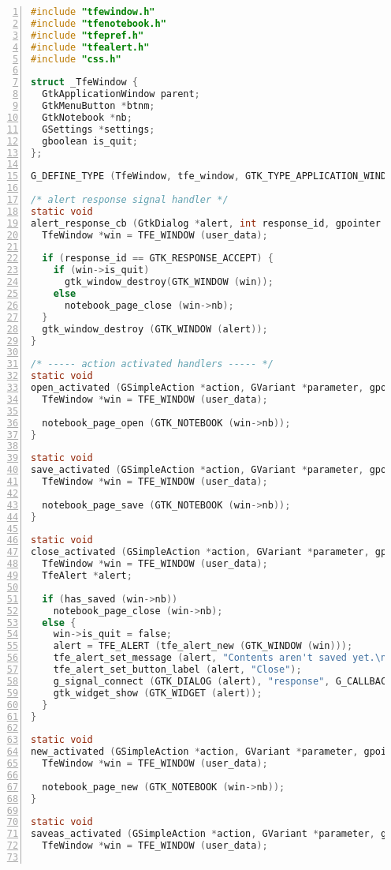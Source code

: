 \begin{lstlisting}[language=C, numbers=left]
#include "tfewindow.h"
#include "tfenotebook.h"
#include "tfepref.h"
#include "tfealert.h"
#include "css.h"

struct _TfeWindow {
  GtkApplicationWindow parent;
  GtkMenuButton *btnm;
  GtkNotebook *nb;
  GSettings *settings;
  gboolean is_quit;
};

G_DEFINE_TYPE (TfeWindow, tfe_window, GTK_TYPE_APPLICATION_WINDOW);

/* alert response signal handler */
static void
alert_response_cb (GtkDialog *alert, int response_id, gpointer user_data) {
  TfeWindow *win = TFE_WINDOW (user_data);

  if (response_id == GTK_RESPONSE_ACCEPT) {
    if (win->is_quit)
      gtk_window_destroy(GTK_WINDOW (win));
    else
      notebook_page_close (win->nb);
  }
  gtk_window_destroy (GTK_WINDOW (alert));
}

/* ----- action activated handlers ----- */
static void
open_activated (GSimpleAction *action, GVariant *parameter, gpointer user_data) {
  TfeWindow *win = TFE_WINDOW (user_data);

  notebook_page_open (GTK_NOTEBOOK (win->nb));
}

static void
save_activated (GSimpleAction *action, GVariant *parameter, gpointer user_data) {
  TfeWindow *win = TFE_WINDOW (user_data);

  notebook_page_save (GTK_NOTEBOOK (win->nb));
}

static void
close_activated (GSimpleAction *action, GVariant *parameter, gpointer user_data) {
  TfeWindow *win = TFE_WINDOW (user_data);
  TfeAlert *alert;

  if (has_saved (win->nb))
    notebook_page_close (win->nb);
  else {
    win->is_quit = false;
    alert = TFE_ALERT (tfe_alert_new (GTK_WINDOW (win)));
    tfe_alert_set_message (alert, "Contents aren't saved yet.\nAre you sure to close?");
    tfe_alert_set_button_label (alert, "Close");
    g_signal_connect (GTK_DIALOG (alert), "response", G_CALLBACK (alert_response_cb), win);
    gtk_widget_show (GTK_WIDGET (alert));
  }
}

static void
new_activated (GSimpleAction *action, GVariant *parameter, gpointer user_data) {
  TfeWindow *win = TFE_WINDOW (user_data);

  notebook_page_new (GTK_NOTEBOOK (win->nb));
}

static void
saveas_activated (GSimpleAction *action, GVariant *parameter, gpointer user_data) {
  TfeWindow *win = TFE_WINDOW (user_data);


\end{lstlisting}
